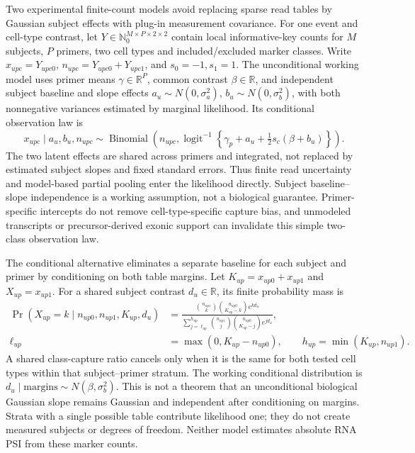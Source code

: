 \documentclass[11pt]{article}
\begin{document}
Two experimental finite-count models avoid replacing sparse read tables by Gaussian subject effects with plug-in measurement covariance. For one event and cell-type contrast, let \(Y\in\mathbb N_0^{M\times P\times2\times2}\) contain local informative-key counts for \(M\) subjects, \(P\) primers, two cell types and included/excluded marker classes. Write \(x_{upc}=Y_{upc0}\), \(n_{upc}=Y_{upc0}+Y_{upc1}\), and \(s_0=-1,s_1=1\). The unconditional working model uses primer means \(\gamma\in\mathbb R^P\), common contrast \(\beta\in\mathbb R\), and independent subject baseline and slope effects \(a_u\sim N(0,\sigma_a^2)\), \(b_u\sim N(0,\sigma_b^2)\), with both nonnegative variances estimated by marginal likelihood. Its conditional observation law is \begin{equation}x_{upc}\mid a_u,b_u,n_{upc}\sim\operatorname{Binomial}\!\left(n_{upc},\operatorname{logit}^{-1}\!\left\{\gamma_p+a_u+\tfrac12s_c(\beta+b_u)\right\}\right).\end{equation} The two latent effects are shared across primers and integrated, not replaced by estimated subject slopes and fixed standard errors. Thus finite read uncertainty and model-based partial pooling enter the likelihood directly. Subject baseline--slope independence is a working assumption, not a biological guarantee. Primer-specific intercepts do not remove cell-type-specific capture bias, and unmodeled transcripts or precursor-derived exonic support can invalidate this simple two-class observation law.

The conditional alternative eliminates a separate baseline for each subject and primer by conditioning on both table margins. Let \(K_{up}=x_{up0}+x_{up1}\) and \(X_{up}=x_{up1}\). For a shared subject contrast \(d_u\in\mathbb R\), its finite probability mass is \begin{equation}\begin{aligned}\Pr(X_{up}=k\mid n_{up0},n_{up1},K_{up},d_u)&=\frac{\binom{n_{up1}}{k}\binom{n_{up0}}{K_{up}-k}e^{kd_u}}{\sum_{j=\ell_{up}}^{h_{up}}\binom{n_{up1}}{j}\binom{n_{up0}}{K_{up}-j}e^{jd_u}},\\\ell_{up}&=\max(0,K_{up}-n_{up0}),\qquad h_{up}=\min(K_{up},n_{up1}).\end{aligned}\end{equation} A shared class-capture ratio cancels only when it is the same for both tested cell types within that subject--primer stratum. The working conditional distribution is \(d_u\mid\text{margins}\sim N(\beta,\sigma_b^2)\). This is not a theorem that an unconditional biological Gaussian slope remains Gaussian and independent after conditioning on margins. Strata with a single possible table contribute likelihood one; they do not create measured subjects or degrees of freedom. Neither model estimates absolute RNA PSI from these marker counts.
\end{document}
